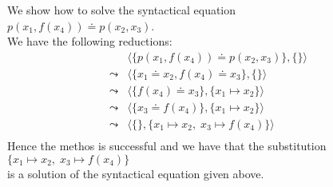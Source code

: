 \example
We show how to solve the syntactical equation \\[0.2cm]
\hspace*{1.3cm}  $p(x_1, f(x_4)) \doteq p( x_2, x_3)$.  \\[0.2cm]
We have the following reductions:
$$
\begin{array}{ll}
          &  \big\langle \big\{ p(x_1, f(x_4)) \doteq p( x_2, x_3) \big\}, \{ \} \big\rangle \\[0.2cm]
 \leadsto &  \big\langle \big\{ x_1 \doteq x_2, f(x_4) \doteq x_3 \big\}, \{ \} \big\rangle \\[0.2cm]
 \leadsto &  \big\langle \big\{ f(x_4) \doteq x_3 \big\}, \{ x_1 \mapsto x_2 \} \big\rangle \\[0.2cm]
 \leadsto &  \big\langle \big\{ x_3 \doteq f(x_4) \big\}, \{ x_1 \mapsto x_2 \} \big\rangle \\[0.2cm]
 \leadsto &  \big\langle \big\{\big\}, \{ x_1 \mapsto x_2,\; x_3 \mapsto f(x_4) \} \big\rangle \\[0.2cm]
\end{array}
$$
Hence the methos is successful and we have that the substitution
\\[0.2cm]
\hspace*{1.3cm}
$\{ x_1 \mapsto x_2,\; x_3 \mapsto f(x_4) \}$ \\[0.2cm]
is a solution of the syntactical equation given above.  \eox

